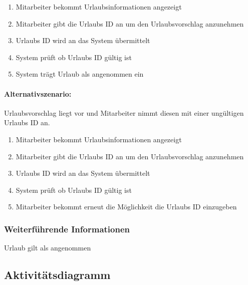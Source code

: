 \begin{enumerate}
	\item Mitarbeiter bekommt Urlaubsinformationen angezeigt
	\item Mitarbeiter gibt die Urlaubs ID an um den Urlaubsvorschlag anzunehmen
	\item Urlaubs ID wird an das System übermittelt
	\item System prüft ob Urlaubs ID gültig ist
	\item System trägt Urlaub als angenommen ein
\end{enumerate}



\paragraph{Alternativszenario:}
Urlaubsvorschlag liegt vor und Mitarbeiter nimmt diesen mit einer ungültigen Urlaubs ID an.

\begin{enumerate}
	\item Mitarbeiter bekommt Urlaubsinformationen angezeigt
	\item Mitarbeiter gibt die Urlaubs ID an um den Urlaubsvorschlag anzunehmen
	\item Urlaubs ID wird an das System übermittelt
	\item System prüft ob Urlaubs ID gültig ist
	\item Mitarbeiter bekommt erneut die Möglichkeit die Urlaubs ID einzugeben
\end{enumerate}


\subsubsection{Weiterführende Informationen}
Urlaub gilt als angenommen

\subsection{Aktivitätsdiagramm}


